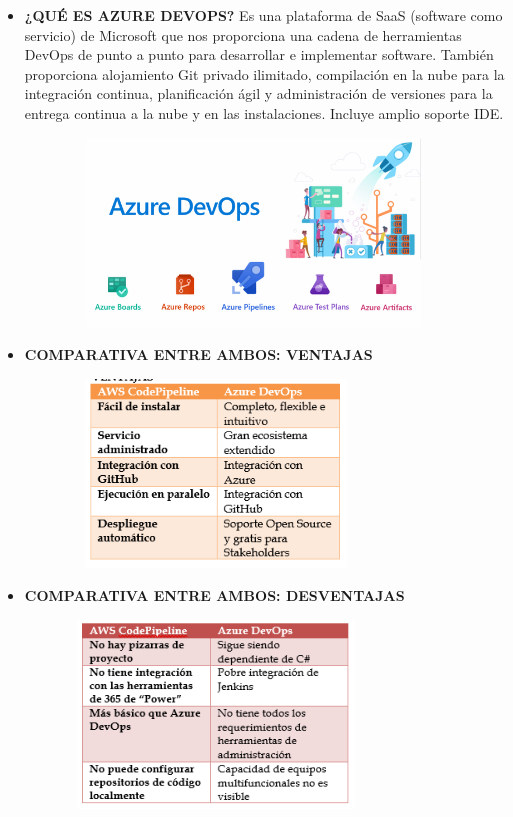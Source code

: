 \documentclass[12pt,a4paper,oneside]{book}
\begin{document}
\begin{enumerate}
\begin{itemize}
					
				\item \textbf{¿QUÉ ES AZURE DEVOPS?}
					Es una plataforma de SaaS (software como servicio) de Microsoft que nos proporciona una cadena de herramientas DevOps de punto a punto para desarrollar e implementar software. También proporciona alojamiento Git privado ilimitado, compilación en la nube para la integración continua, planificación ágil y administración de versiones para la entrega continua a la nube y en las instalaciones. Incluye amplio soporte IDE.\\
					\begin{center}
						\begin{figure}[htb]
							\centering \includegraphics[width=10cm, height=5cm]{img/azure.png}
						\end{figure}
					\end{center}
						
				\item \textbf{COMPARATIVA ENTRE AMBOS: VENTAJAS}
					\begin{center}
						\begin{figure}[htb]
							\centering \includegraphics[width=8cm, height=5cm]{img/comparativa1.png}
						\end{figure}
					\end{center}
		 \newpage
				\item \textbf{COMPARATIVA ENTRE AMBOS: DESVENTAJAS}
					\begin{center}
						\begin{figure}[htb]
							\centering \includegraphics[width=8cm, height=5cm]{img/comparativa2.png}
						\end{figure}
					\end{center}
					

\end{itemize}
\end{enumerate}
\end{document}
